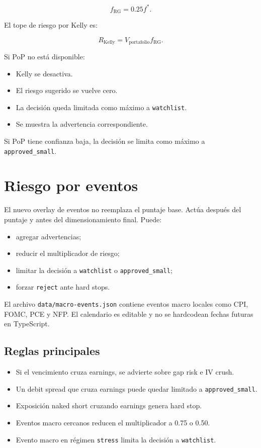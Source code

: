 \documentclass[11pt,letterpaper]{article}
\begin{document}
\[
f_{\text{RG}} = 0.25 f^*.
\]

El tope de riesgo por Kelly es:

\[
R_{\text{Kelly}} = V_{\text{portafolio}} f_{\text{RG}}.
\]

Si PoP no est\'a disponible:

\begin{itemize}[noitemsep]
  \item Kelly se desactiva.
  \item El riesgo sugerido se vuelve cero.
  \item La decisi\'on queda limitada como m\'aximo a \texttt{watchlist}.
  \item Se muestra la advertencia correspondiente.
\end{itemize}

Si PoP tiene confianza baja, la decisi\'on se limita como m\'aximo a
\texttt{approved\_small}.

\section{Riesgo por eventos}

El nuevo overlay de eventos no reemplaza el puntaje base. Act\'ua despu\'es del
puntaje y antes del dimensionamiento final. Puede:

\begin{itemize}[noitemsep]
  \item agregar advertencias;
  \item reducir el multiplicador de riesgo;
  \item limitar la decisi\'on a \texttt{watchlist} o \texttt{approved\_small};
  \item forzar \texttt{reject} ante hard stops.
\end{itemize}

El archivo \texttt{data/macro-events.json} contiene eventos macro locales como
CPI, FOMC, PCE y NFP. El calendario es editable y no se hardcodean fechas futuras
en TypeScript.

\subsection{Reglas principales}

\begin{itemize}[noitemsep]
  \item Si el vencimiento cruza earnings, se advierte sobre gap risk e IV crush.
  \item Un debit spread que cruza earnings puede quedar limitado a
        \texttt{approved\_small}.
  \item Exposici\'on naked short cruzando earnings genera hard stop.
  \item Eventos macro cercanos reducen el multiplicador a 0.75 o 0.50.
  \item Evento macro en r\'egimen \texttt{stress} limita la decisi\'on a
        \texttt{watchlist}.
\end{itemize}
\end{document}
